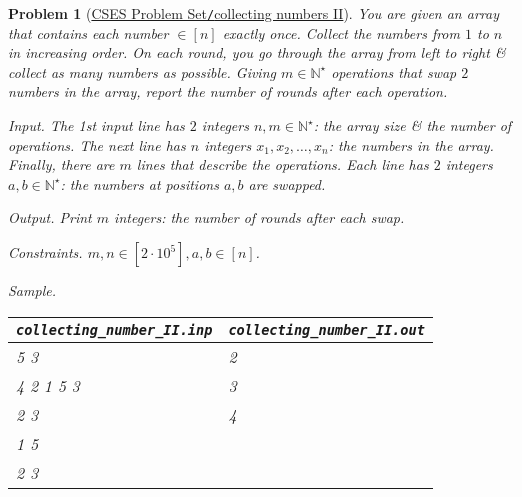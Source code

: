 \documentclass{article}
\newtheorem{problem}{Problem}
\begin{document}
\begin{problem}[\href{https://cses.fi/problemset/task/2217}{CSES Problem Set{\tt/}collecting numbers II}]
    You are given an array that contains each number $\in[n]$ exactly once. Collect the numbers from $1$ to $n$ in increasing order. On each round, you go through the array from left to right \& collect as many numbers as possible. Giving $m\in\mathbb{N}^\star$ operations that swap $2$ numbers in the array, report the number of rounds after each operation.
    \item {\sf Input.} The 1st input line has $2$ integers $n,m\in\mathbb{N}^\star$: the array size \& the number of operations. The next line has $n$ integers $x_1,x_2,\ldots,x_n$: the numbers in the array. Finally, there are $m$ lines that describe the operations. Each line has $2$ integers $a,b\in\mathbb{N}^\star$: the numbers at positions $a,b$ are swapped.
    \item {\sf Output.} Print $m$ integers: the number of rounds after each swap.
    \item {\sf Constraints.} $m,n\in[2\cdot10^5],a,b\in[n]$.
    \item {\sf Sample.}
    \begin{table}[H]
        \centering
        \begin{tabular}{|l|l|}
            \hline
            \verb|collecting_number_II.inp| & \verb|collecting_number_II.out| \\
            \hline
            5 3 & 2 \\
            4 2 1 5 3 & 3 \\
            2 3 & 4 \\
            1 5 & \\
            2 3 & \\
            \hline
        \end{tabular}
    \end{table}
\end{problem}
\end{document}
